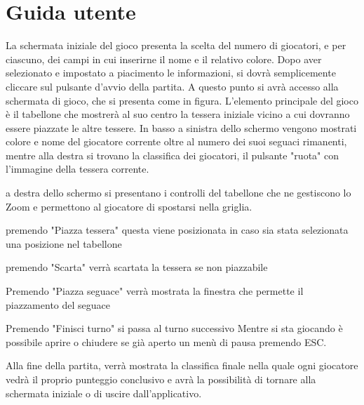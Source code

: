 \section{Guida utente}
La schermata iniziale del gioco presenta la scelta del numero di giocatori, e per ciascuno, dei campi in cui inserirne il nome e il relativo colore. Dopo aver selezionato e impostato a piacimento le informazioni, si dovrà semplicemente cliccare sul pulsante d'avvio della partita. A questo punto si avrà accesso alla schermata di gioco, che si presenta come in figura. L'elemento principale del gioco è il tabellone che mostrerà al suo centro la tessera iniziale vicino a cui dovranno essere piazzate le altre tessere. In basso a sinistra dello schermo vengono mostrati colore e nome del giocatore corrente oltre al numero dei suoi seguaci rimanenti, mentre alla destra si trovano la classifica dei giocatori, il pulsante "ruota" con l'immagine della tessera corrente.

a destra dello schermo si presentano i controlli del tabellone che ne gestiscono lo Zoom e permettono al giocatore di spostarsi nella griglia.

premendo "Piazza tessera" questa viene posizionata in caso sia stata selezionata una posizione nel tabellone

premendo "Scarta" verrà scartata la tessera se non piazzabile

Premendo "Piazza seguace" verrà mostrata la finestra che permette il piazzamento del seguace

Premendo "Finisci turno" si passa al turno successivo
Mentre si sta giocando è possibile aprire o chiudere se già aperto un menù di pausa premendo ESC.

Alla fine della partita, verrà mostrata la classifica finale nella quale ogni giocatore vedrà il proprio punteggio conclusivo e avrà la possibilità di tornare alla schermata iniziale o di uscire dall'applicativo.
